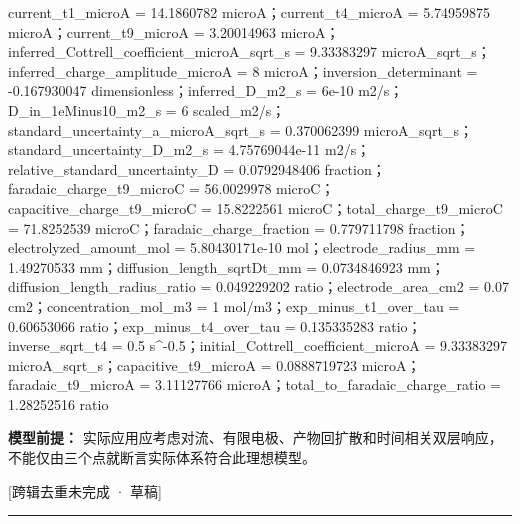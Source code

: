 \documentclass[UTF8,11pt,a4paper]{ctexart}
\begin{document}
current\_t1\_microA = 14.1860782 microA；current\_t4\_microA = 5.74959875 microA；current\_t9\_microA = 3.20014963 microA；inferred\_Cottrell\_coefficient\_microA\_sqrt\_s = 9.33383297 microA\_sqrt\_s；inferred\_charge\_amplitude\_microA = 8 microA；inversion\_determinant = -0.167930047 dimensionless；inferred\_D\_m2\_s = 6e-10 m2/s；D\_in\_1eMinus10\_m2\_s = 6 scaled\_m2/s；standard\_uncertainty\_a\_microA\_sqrt\_s = 0.370062399 microA\_sqrt\_s；standard\_uncertainty\_D\_m2\_s = 4.75769044e-11 m2/s；relative\_standard\_uncertainty\_D = 0.0792948406 fraction；faradaic\_charge\_t9\_microC = 56.0029978 microC；capacitive\_charge\_t9\_microC = 15.8222561 microC；total\_charge\_t9\_microC = 71.8252539 microC；faradaic\_charge\_fraction = 0.779711798 fraction；electrolyzed\_amount\_mol = 5.80430171e-10 mol；electrode\_radius\_mm = 1.49270533 mm；diffusion\_length\_sqrtDt\_mm = 0.0734846923 mm；diffusion\_length\_radius\_ratio = 0.049229202 ratio；electrode\_area\_cm2 = 0.07 cm2；concentration\_mol\_m3 = 1 mol/m3；exp\_minus\_t1\_over\_tau = 0.60653066 ratio；exp\_minus\_t4\_over\_tau = 0.135335283 ratio；inverse\_sqrt\_t4 = 0.5 s\textasciicircum{}-0.5；initial\_Cottrell\_coefficient\_microA = 9.33383297 microA\_sqrt\_s；capacitive\_t9\_microA = 0.0888719723 microA；faradaic\_t9\_microA = 3.11127766 microA；total\_to\_faradaic\_charge\_ratio = 1.28252516 ratio\par
\noindent\textbf{模型前提：}
实际应用应考虑对流、有限电极、产物回扩散和时间相关双层响应，不能仅由三个点就断言实际体系符合此理想模型。\par
\noindent\textcolor{red!65!black}{[跨辑去重未完成 · 草稿]} \par
\medskip\hrule\medskip
{}
\end{document}
